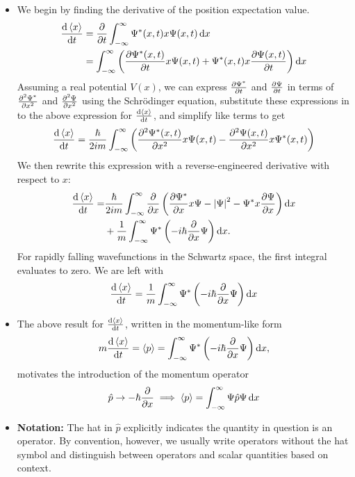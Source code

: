 \documentclass[11pt, a4paper]{article}
\newcommand{\diff}{\mathop{}\!\mathrm{d}} %
\newcommand{\Schro}{Schr\"{o}dinger\xspace}
\renewcommand{\P}{\Psi}  %
\begin{document}
\begin{itemize}
	\item We begin by finding the derivative of the position expectation value.
	\begin{align*}
		\dv{\ev{x}}{t} &= \pdv{t}\int_{-\infty}^{\infty} \Psi^{*}(x, t)x\Psi(x,t)\diff x \\
		&= \int_{-\infty}^{\infty} \left(\pdv{\P^{*}(x, t)}{t} x \P(x, t) + \P^{*}(x, t)x\pdv{\P(x, t)}{t}\right)\diff x
	\end{align*}
	Assuming a real potential $ V(x) $, we can express $ \pdv{\P^{*}}{t} $ and $ \pdv{\P}{t} $ in terms of $ \pdv[2]{\P^{*}}{x} $ and $ \pdv[2]{\P}{x} $ using the \Schro equation, substitute these expressions in to the above expression for $ \dv{\ev{x}}{t} $, and simplify like terms to get
	\begin{equation*}
		\dv{\ev{x}}{t} = \frac{\hbar}{2im}\int_{-\infty}^{\infty} \left( \pdv[2]{\P^{*}(x, t)}{x} x \P(x, t) - \pdv[2]{\P(x, t)}{x} x \P^{*}(x, t) \right)
	\end{equation*}
	We then rewrite this expression with a reverse-engineered derivative with respect to $ x $:
	\begin{align*}
		\dv{\ev{x}}{t} = & \frac{\hbar}{2im} \int_{-\infty}^{\infty} \pdv{x}\left(\pdv{\P^{*}}{x}x\P - \abs{\P}^{2} - \P^{*}x\pdv{\P}{x}\right)\diff x\\
		& + \frac{1}{m} \int_{-\infty}^{\infty} \P^{*} \left(-i\hbar \pdv{x}\P\right)\diff x.
	\end{align*}
	For rapidly falling wavefunctions in the Schwartz space, the first integral evaluates to zero. We are left with
	\begin{equation*}
		\dv{\ev{x}}{t} = \frac{1}{m} \int_{-\infty}^{\infty} \P^{*} \left(-i\hbar \pdv{x}\P\right)\diff x
	\end{equation*}
	
	\item The above result for $ \dv{\ev{x}}{t} $, written in the momentum-like form
	\begin{equation*}
		m \dv{\ev{x}}{t} = \ev{p} = \int_{-\infty}^{\infty} \P^{*} \left(-i\hbar \pdv{x}\P\right)\diff x,
	\end{equation*}
	motivates the introduction of the momentum operator
	\begin{equation*}
		\hat{p} \to - \hbar \pdv{x} \implies \ev{p} = \int_{-\infty}^{\infty} \P \hat{p} \P \diff x
	\end{equation*}
	
	\item \textbf{Notation:} The hat in $ \hat{p} $ explicitly indicates the quantity in question is an operator. By convention, however, we usually write operators without the hat symbol and distinguish between operators and scalar quantities based on context.
	

\end{itemize}
\end{document}
